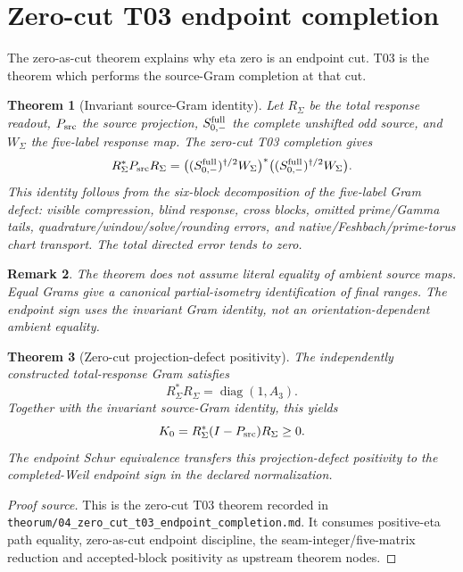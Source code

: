 \documentclass[11pt]{article}
\newtheorem{theorem}{Theorem}[section]
\newtheorem{remark}[theorem]{Remark}
\newcommand{\Psrc}{P_{\rm src}}
\newcommand{\RSigma}{R_\Sigma}
\newcommand{\WSigma}{W_\Sigma}
\newcommand{\Sminus}{S_{0,-}^{\rm full}}
\begin{document}
\section{Zero-cut T03 endpoint completion}

The zero-as-cut theorem explains why eta zero is an endpoint cut.  T03 is the theorem which performs the source-Gram completion at that cut.

\begin{theorem}[Invariant source-Gram identity]
Let \(\RSigma\) be the total response readout, \(\Psrc\) the source projection, \(\Sminus\) the complete unshifted odd source, and \(\WSigma\) the five-label response map.  The zero-cut T03 completion gives
\[
\RSigma^*\Psrc\RSigma
=
\bigl((\Sminus)^{\dagger/2}\WSigma\bigr)^*
\bigl((\Sminus)^{\dagger/2}\WSigma\bigr).
\]
This identity follows from the six-block decomposition of the five-label Gram defect: visible compression, blind response, cross blocks, omitted prime/Gamma tails, quadrature/window/solve/rounding errors, and native/Feshbach/prime-torus chart transport.  The total directed error tends to zero.
\end{theorem}

\begin{remark}
The theorem does not assume literal equality of ambient source maps.  Equal Grams give a canonical partial-isometry identification of final ranges.  The endpoint sign uses the invariant Gram identity, not an orientation-dependent ambient equality.
\end{remark}

\begin{theorem}[Zero-cut projection-defect positivity]
The independently constructed total-response Gram satisfies
\[
\RSigma^*\RSigma=\operatorname{diag}(1,A_3).
\]
Together with the invariant source-Gram identity, this yields
\[
K_0=\RSigma^*(I-\Psrc)\RSigma\ge0.
\]
The endpoint Schur equivalence transfers this projection-defect positivity to the completed-Weil endpoint sign in the declared normalization.
\end{theorem}

\begin{proof}[Proof source]
This is the zero-cut T03 theorem recorded in \texttt{theorum/04\_zero\_cut\_t03\_endpoint\_completion.md}.  It consumes positive-eta path equality, zero-as-cut endpoint discipline, the seam-integer/five-matrix reduction and accepted-block positivity as upstream theorem nodes.
\end{proof}
\end{document}
